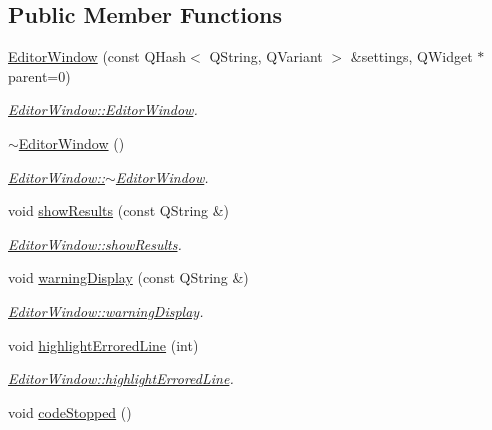 \subsection*{Public Member Functions}
\begin{DoxyCompactItemize}
\item 
\hyperlink{classEditorWindow_a6917407d81bd85ebc2af2f3915f62d56}{Editor\+Window} (const Q\+Hash$<$ Q\+String, Q\+Variant $>$ \&settings, Q\+Widget $\ast$parent=0)
\begin{DoxyCompactList}\small\item\em \hyperlink{classEditorWindow_a6917407d81bd85ebc2af2f3915f62d56}{Editor\+Window\+::\+Editor\+Window}. \end{DoxyCompactList}\item 
\hyperlink{classEditorWindow_a7dd5c84136960d8ba831b04993811cf3}{$\sim$\+Editor\+Window} ()
\begin{DoxyCompactList}\small\item\em \hyperlink{classEditorWindow_a7dd5c84136960d8ba831b04993811cf3}{Editor\+Window\+::$\sim$\+Editor\+Window}. \end{DoxyCompactList}\item 
void \hyperlink{classEditorWindow_a0ad1d080a548df7eb21ce05c50775e70}{show\+Results} (const Q\+String \&)
\begin{DoxyCompactList}\small\item\em \hyperlink{classEditorWindow_a0ad1d080a548df7eb21ce05c50775e70}{Editor\+Window\+::show\+Results}. \end{DoxyCompactList}\item 
void \hyperlink{classEditorWindow_ac40c7db381c4aa179667cc3803503880}{warning\+Display} (const Q\+String \&)
\begin{DoxyCompactList}\small\item\em \hyperlink{classEditorWindow_ac40c7db381c4aa179667cc3803503880}{Editor\+Window\+::warning\+Display}. \end{DoxyCompactList}\item 
void \hyperlink{classEditorWindow_af965f642e397d238c963df15e8561694}{highlight\+Errored\+Line} (int)
\begin{DoxyCompactList}\small\item\em \hyperlink{classEditorWindow_af965f642e397d238c963df15e8561694}{Editor\+Window\+::highlight\+Errored\+Line}. \end{DoxyCompactList}\item 
void \hyperlink{classEditorWindow_a03cc1e6ae0c550c6f5fff486eaf6b508}{code\+Stopped} ()

\end{DoxyCompactItemize}
